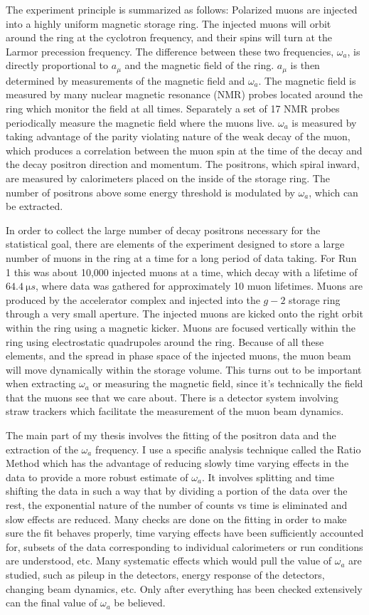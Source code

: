 \documentclass[12pt,letterpaper]{article}
\def\wa{$\omega_{a}$\xspace}
\def\gmtwo{$g-2$\xspace}
\def\amu{$a_{\mu}$\xspace}
\begin{document}
The experiment principle is summarized as follows: Polarized muons are injected into a highly uniform magnetic storage ring. The injected muons will orbit around the ring at the cyclotron frequency, and their spins will turn at the Larmor precession frequency. The difference between these two frequencies, \wa, is directly proportional to \amu and the magnetic field of the ring. \amu is then determined by measurements of the magnetic field and \wa. The magnetic field is measured by many nuclear magnetic resonance (NMR) probes located around the ring which monitor the field at all times. Separately a set of 17 NMR probes periodically measure the magnetic field where the muons live. \wa is measured by taking advantage of the parity violating nature of the weak decay of the muon, which produces a correlation between the muon spin at the time of the decay and the decay positron direction and momentum. The positrons, which spiral inward, are measured by calorimeters placed on the inside of the storage ring. The number of positrons above some energy threshold is modulated by \wa, which can be extracted.


In order to collect the large number of decay positrons necessary for the statistical goal, there are elements of the experiment designed to store a large number of muons in the ring at a time for a long period of data taking. For Run 1 this was about 10,000 injected muons at a time, which decay with a lifetime of $\SI{64.4}{\micro s}$, where data was gathered for approximately 10 muon lifetimes. Muons are produced by the accelerator complex and injected into the \gmtwo storage ring through a very small aperture. The injected muons are kicked onto the right orbit within the ring using a magnetic kicker. Muons are focused vertically within the ring using electrostatic quadrupoles around the ring. Because of all these elements, and the spread in phase space of the injected muons, the muon beam will move dynamically within the storage volume. This turns out to be important when extracting \wa or measuring the magnetic field, since it's technically the field that the muons see that we care about. There is a detector system involving straw trackers which facilitate the measurement of the muon beam dynamics.


The main part of my thesis involves the fitting of the positron data and the extraction of the \wa frequency. I use a specific analysis technique called the Ratio Method which has the advantage of reducing slowly time varying effects in the data to provide a more robust estimate of \wa. It involves splitting and time shifting the data in such a way that by dividing a portion of the data over the rest, the exponential nature of the number of counts vs time is eliminated and slow effects are reduced. Many checks are done on the fitting in order to make sure the fit behaves properly, time varying effects have been sufficiently accounted for, subsets of the data corresponding to individual calorimeters or run conditions are understood, etc. Many systematic effects which would pull the value of \wa are studied, such as pileup in the detectors, energy response of the detectors, changing beam dynamics, etc. Only after everything has been checked extensively can the final value of \wa be believed. 
\end{document}

